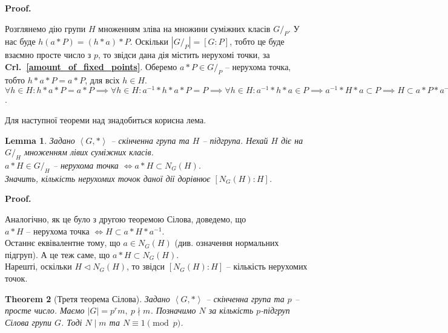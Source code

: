 \documentclass[a4paper, 10pt]{article}
\makeatletter
\theoremstyle{theoremdd}
\newtheorem{theorem}{Theorem}[subsection]
\theoremstyle{theoremdd}
\theoremstyle{theoremdd}
\theoremstyle{theoremdd}
\theoremstyle{theoremdd}
\theoremstyle{theoremdd}
\theoremstyle{theoremdd}
\theoremstyle{theoremdd}
\theoremstyle{theoremdd}
\theoremstyle{theoremdd}
\theoremstyle{theoremdd}
\theoremstyle{theoremdd}
\theoremstyle{theoremdd}
\newtheorem{lemma}[theorem]{Lemma}
\theoremstyle{theoremdd}
\theoremstyle{theoremdd}
\renewenvironment{proof}[1][Proof.\\]{\par
\pushQED{\hfill \qed}%
\normalfont \topsep6\p@\@plus6\p@\relax
\trivlist
\item\relax
{\bfseries
#1\@addpunct{.}}\hspace\labelsep\ignorespaces
}{%
\popQED\endtrivlist\@endpefalse
}
\newcommand\crlref[1]{\textbf{Crl.~\ref{#1}}}
\makeatother
\begin{document}
\begin{proof}
Розглянемо дію групи $H$ множенням зліва на множини суміжних класів $G/_P$. У нас буде $h (a*P) = (h*a)*P$. Оскільки $|G/_P| = [G:P]$, тобто це буде взаємно просте число з $p$, то звідси дана дія містить нерухомі точки, за \crlref{amount_of_fixed_points}. Оберемо $a*P \in G/_P$ -- нерухома точка, тобто $h*a*P = a*P$, для всіх $h \in H$.\\
$\forall h \in H: h*a*P = a*P \implies \forall h \in H: a^{-1}*h*a*P = P \implies \forall h \in H: a^{-1}*h*a \in P \implies a^{-1}*H*a \subset P \implies H \subset a*P*a^{-1}$.
\end{proof}

Для наступної теореми над знадобиться корисна лема.
\begin{lemma}
Задано $\left< G, *\right>$ -- скінченна група та $H$ -- підгрупа. Нехай $H$ діє на $G/_H$ множенням лівих суміжних класів.\\
$a*H \in G/_H$ -- нерухома точка $\iff a*H \subset N_G(H)$.\\
Значить, кількість нерухомих точок даної дії дорівнює $[N_G(H):H]$.
\end{lemma}

\begin{proof}
Аналогічно, як це було з другою теоремою Сілова, доведемо, що\\
$a*H$ -- нерухома точка $\iff H \subset a*H*a^{-1}$.\\
Останнє еквівалентне тому, що $a \in N_G(H)$ (див. означення нормальних підгруп). А це теж саме, що $a*H \subset N_G(H)$.\\
Нарешті, оскільки $H \triangleleft N_G(H)$, то звідси $[N_G(H):H]$ -- кількість нерухомих точок.
\end{proof}

\begin{theorem}[Третя теорема Сілова]
Задано $\left< G, *\right>$ -- скінченна група та $p$ -- просте число. Маємо $|G| = p^r m,\ p \nmid m$. Позначимо $N$ за кількість $p$-підгруп Сілова групи $G$. Тоді $N \mid m$ та $N \equiv 1 \pmod p$.
\end{theorem}
\end{document}
